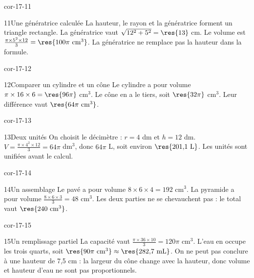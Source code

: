 \begin{blocLivre}{cor-17-11}\begin{corrige}{11}{Une génératrice calculée}
La hauteur, le rayon et la génératrice forment un triangle rectangle. La génératrice vaut $\sqrt{12^2+5^2}=\res{13}$ cm. Le volume est $\frac{\pi\times5^2\times12}3=\res{100\pi\ \mathrm{cm}^3}$. La génératrice ne remplace pas la hauteur dans la formule.
\label{fig-cor-17-11}
\end{corrige}\end{blocLivre}
\begin{blocLivre}{cor-17-12}\begin{corrige}{12}{Comparer un cylindre et un cône}
Le cylindre a pour volume $\pi\times16\times6=\res{96\pi}$ cm$^3$. Le cône en a le tiers, soit $\res{32\pi}$ cm$^3$. Leur différence vaut $\res{64\pi\ \mathrm{cm}^3}$.
\label{fig-cor-17-12}
\end{corrige}\end{blocLivre}
\begin{blocLivre}{cor-17-13}\begin{corrige}{13}{Deux unités}
On choisit le décimètre : $r=4$ dm et $h=12$ dm. $V=\frac{\pi\times4^2\times12}3=64\pi$ dm$^3$, donc $64\pi$ L, soit environ $\res{201{,}1\ \mathrm L}$. Les unités sont unifiées avant le calcul.
\label{fig-cor-17-13}
\end{corrige}\end{blocLivre}
\begin{blocLivre}{cor-17-14}\begin{corrige}{14}{Un assemblage}
Le pavé a pour volume $8\times6\times4=192$ cm$^3$. La pyramide a pour volume $\frac{8\times6\times3}3=48$ cm$^3$. Les deux parties ne se chevauchent pas : le total vaut $\res{240\ \mathrm{cm}^3}$.
\label{fig-cor-17-14}
\end{corrige}\end{blocLivre}
\begin{blocLivre}{cor-17-15}\begin{corrige}{15}{Un remplissage partiel}
La capacité vaut $\frac{\pi\times36\times10}3=120\pi$ cm$^3$. L’eau en occupe les trois quarts, soit $\res{90\pi\ \mathrm{cm}^3}\approx\res{282{,}7\ \mathrm{mL}}$. On ne peut pas conclure à une hauteur de 7,5 cm : la largeur du cône change avec la hauteur, donc volume et hauteur d’eau ne sont pas proportionnels.
\label{fig-cor-17-15}
\end{corrige}\end{blocLivre}
